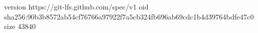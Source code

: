 version https://git-lfs.github.com/spec/v1
oid sha256:90b3b8572ab54cf76766a97922f7a5cb324fb696ab69cdc1b4d39764bdfe47c0
size 43840
